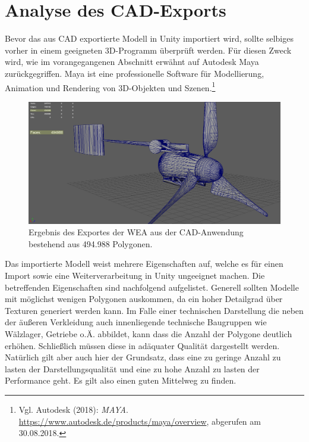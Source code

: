 \section{Analyse des CAD-Exports}
\label{sec:AnalyseDesCAD-Exports}
Bevor das aus CAD exportierte Modell in Unity importiert wird, sollte selbiges vorher in einem geeigneten 3D-Programm überprüft werden. Für diesen Zweck wird, wie im vorangegangenen Abschnitt erwähnt auf Autodesk Maya zurückgegriffen. Maya ist eine professionelle Software für Modellierung, Animation und Rendering von 3D-Objekten und Szenen.\footnote{Vgl. Autodesk  (2018): \textit{MAYA}.\newline
\url{https://www.autodesk.de/products/maya/overview},\newline 
abgerufen am 30.08.2018.}

\begin{figure}[H]
	\centering
	\captionsetup{width=1\textwidth}
	\includegraphics[keepaspectratio, width=1\textwidth]{bildquellen/WEA-Vergleich1}
	\caption{Ergebnis des Exportes der WEA aus der CAD-Anwendung bestehend aus 494.988 Polygonen.}
	\label{fig:2.2}
\end{figure}

Das importierte Modell  weist mehrere Eigenschaften auf, welche es für einen Import sowie eine Weiterverarbeitung in Unity ungeeignet machen. Die betreffenden Eigenschaften sind nachfolgend aufgelistet. 
Generell sollten Modelle mit möglichst wenigen Polygonen auskommen, da ein hoher Detailgrad über Texturen generiert werden kann. Im Falle einer technischen Darstellung die neben der äußeren Verkleidung auch innenliegende technische Baugruppen wie Wälzlager, Getriebe o.Ä. abbildet, kann dass die Anzahl der Polygone deutlich erhöhen. Schließlich müssen diese in adäquater Qualität dargestellt werden. Natürlich gilt aber auch hier der Grundsatz, dass eine zu geringe Anzahl zu lasten der Darstellungsqualität und eine zu hohe Anzahl zu lasten der Performance geht. Es gilt also einen guten Mittelweg zu finden. 


